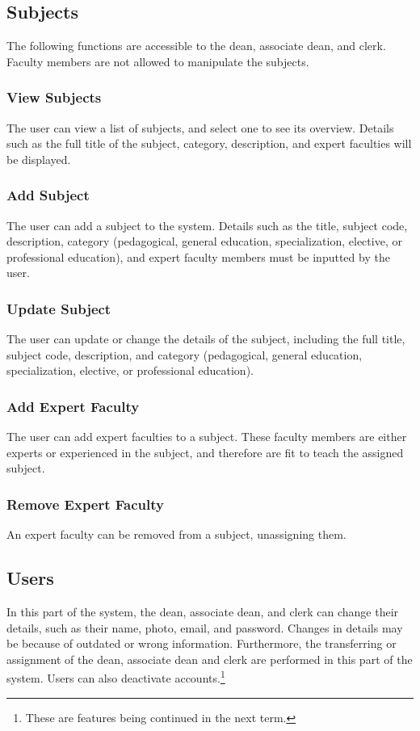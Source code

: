     \subsection{Subjects}
    The following functions are accessible to the dean, associate dean, and clerk. Faculty members are not allowed to manipulate the subjects.
    
        \subsubsection{View Subjects}
        The user can view a list of subjects, and select one to see its overview. Details such as the full title of the subject, category, description, and expert faculties will be displayed.
        
        \subsubsection{Add Subject}
        The user can add a subject to the system. Details such as the title, subject code, description, category (pedagogical, general education, specialization, elective, or professional education), and expert faculty members must be inputted by the user.
        
        \subsubsection{Update Subject}
        The user can update or change the details of the subject, including the full title, subject code, description, and category (pedagogical, general education, specialization, elective, or professional education).
        
        \subsubsection{Add Expert Faculty}
        The user can add expert faculties to a subject. These faculty members are either experts or experienced in the subject, and therefore are fit to teach the assigned subject.
        
        \subsubsection{Remove Expert Faculty}
        An expert faculty can be removed from a subject, unassigning them.
    
    \subsection{Users}
    In this part of the system, the dean, associate dean, and clerk can change their details, such as their name, photo, email, and password. Changes in details may be because of outdated or wrong information. Furthermore, the transferring or assignment of the dean, associate dean and clerk are performed in this part of the system. Users can also deactivate accounts.\footnote{These are features being continued in the next term.}
    
